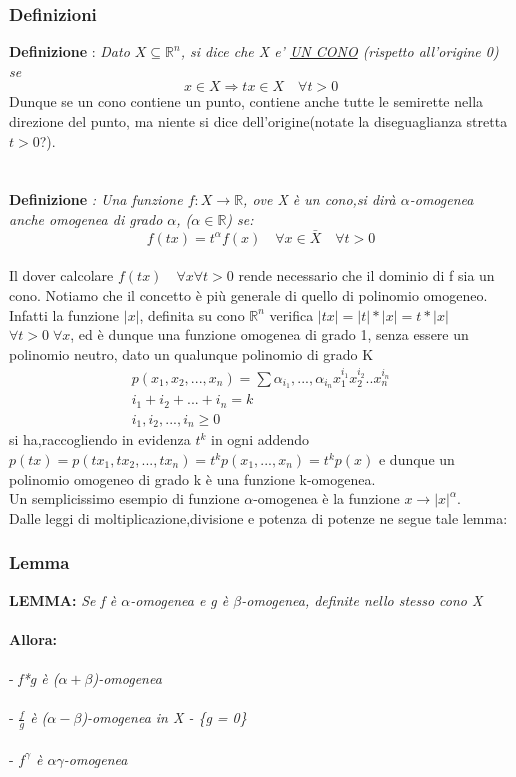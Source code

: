 \documentclass[fontsize = 20px, paper = a4]{article}
\begin{document}
\subsubsection{Definizioni}
\textbf{Definizione} :  \emph{Dato $X\subseteq \mathbb{R}^n$, si dice che X e' \underline{UN CONO} (rispetto all'origine \hspace*{2.3cm} 0) se}
$$x\in X \Rightarrow tx \in X \quad \forall t > 0$$
Dunque se un cono contiene un punto, contiene anche tutte le semirette nella direzione del punto, ma niente si dice dell'origine(notate la diseguaglianza stretta $t>0$?).\\ \\\\
\textbf{Definizione} \emph{: Una funzione $f:X\rightarrow\mathbb{R}$, ove X è un cono,si dirà $\alpha$-omogenea \hspace*{2.4cm}anche omogenea di grado $\alpha$, ($\alpha \in \mathbb{R}$) se: }\\ 
$$f(tx) = t^\alpha f(x) \quad \forall x \in \bar{X} \quad \forall t>0 $$ \\
Il dover calcolare $f(tx)\quad \forall x \forall t >0 $ rende necessario che il dominio di f sia un cono. Notiamo che il concetto è più generale di quello di polinomio omogeneo. Infatti la funzione $| x | $, definita su cono $\mathbb{R}^n$
 verifica $| tx | = | t | * | x | = t * | x |  $ $\forall t > 0 \; \forall x$, ed è dunque una funzione omogenea di grado 1, senza essere un polinomio neutro, dato un qualunque polinomio di grado K
 $$\begin{array}{lcl}p(x_1,x_2,...,x_n) =  \sum{\alpha_{i_1},...,\alpha_{i_n} x_1^{i_1} x_2^{i_2}.. x_n^{i_n}}\\ i_1 + i_2 +...+i_n = k \\ i_1,i_2,...,i_n \ge 0 \end{array}$$ 
si ha,raccogliendo in evidenza $t^k$ in ogni addendo $p(tx) = p(tx_1,tx_2,...,tx_n) = t^kp(x_1,...,x_n) = t^kp(x)$
e dunque un polinomio omogeneo di grado k è una funzione k-omogenea.\\
Un semplicissimo esempio di funzione $\alpha$-omogenea è la funzione $x\rightarrow|x|^\alpha$.\\
Dalle leggi di moltiplicazione,divisione e potenza di potenze ne segue tale lemma:\\
\subsubsection{Lemma}
\textbf{LEMMA: }\emph{Se f è $\alpha$-omogenea e g è $\beta$-omogenea, definite nello stesso cono X} \\ \\ \textbf{Allora: }	\\\\
\hspace*{1.5cm}- \emph{f*g è ($\alpha + \beta$)-omogenea}\\\\
\hspace*{1.5cm}- \emph{$\frac{f}{g}$ è ($\alpha - \beta$)-omogenea in X - \{g = 0\}}\\\\
\hspace*{1.5cm}- \emph{$f^{\gamma }$ è $\alpha \gamma $-omogenea}\\
\end{document}
